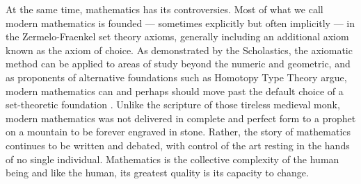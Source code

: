 \documentclass[12pt]{article}
\begin{document}
At the same time,
mathematics has its controversies.
Most of what we call modern mathematics
is founded ---
sometimes explicitly but often implicitly ---
in the Zermelo-Fraenkel set theory axioms,
generally including an additional axiom
known as the axiom of choice.
As demonstrated by the Scholastics,
the axiomatic method can be applied to
areas of study beyond the numeric and geometric,
and as proponents of alternative foundations
such as Homotopy Type Theory argue,
modern mathematics can and perhaps should
move past the default choice of a set-theoretic foundation \cite{ladyman}.
Unlike the scripture of
those tireless medieval monk,
modern mathematics was not delivered
in complete and perfect form
to a prophet on a mountain
to be forever engraved in stone.
Rather, the story of mathematics
continues to be written and debated,
with control of the art resting
in the hands of
no single individual.
Mathematics is the collective complexity
of the human being
and like the human,
its greatest quality
is its capacity to change.














\end{document}
